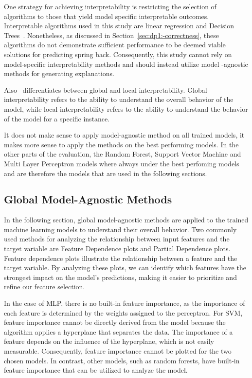 One strategy for achieving interpretability is restricting the selection of algorithms to those that yield
model specific interpretable outcomes.
Interpretable algorithms used in this study are linear regression and Decision
Trees~\cite[p. 35]{molnar2020interpretable}.
Nonetheless, as discussed in Section~\ref{sec:dp1:-correctness}, these algorithms do not demonstrate sufficient
performance to be deemed viable solutions for predicting spring back.
Consequently, this study cannot rely on model-specific interpretability methods and should instead utilize model
-agnostic methods for generating explanations.

Also~\cite{molnar2020interpretable} differentiates between global and local interpretability.
Global interpretability refers to the ability to understand the overall behavior of
the model, while local interpretability refers to the ability to understand the behavior of the
model for a specific instance.

It does not make sense to apply model-agnostic method on all trained models, it makes more sense to
apply the methods on the best performing models.
In the other parts of the evaluation, the Random Forest, Support Vector Machine and Multi Layer Perceptron models
where always under the best perfoming models and are therefore the models that are used in the following
sections.

\subsection{Global Model-Agnostic Methods}\label{subsec:global-model-agnostic-methods}
In the following section, global model-agnostic methods are applied to the trained machine learning models to
understand their overall behavior.
Two commonly used methods for analyzing the relationship between input features
and the target variable are Feature Dependence plots and Partial Dependence plots.
Feature dependence plots illustrate the relationship between a feature and the target variable.
By analyzing these plots, we can identify which features have the strongest impact on the model's
predictions, making it easier to prioritize and refine our feature selection.

In the case of \ac{MLP}, there is no built-in feature importance, as the importance of each feature is determined by
the weights assigned to the perceptron.
For \ac{SVM}, feature importance cannot be directly derived from the model
because the algorithm applies a hyperplane that separates the data.
The importance of a feature depends on the
influence of the hyperplane, which is not easily measurable.
Consequently, feature importance cannot be plotted for
the two chosen models.
In contrast, other models, such as random forests, have built-in feature importance that can
be utilized to analyze the model.


